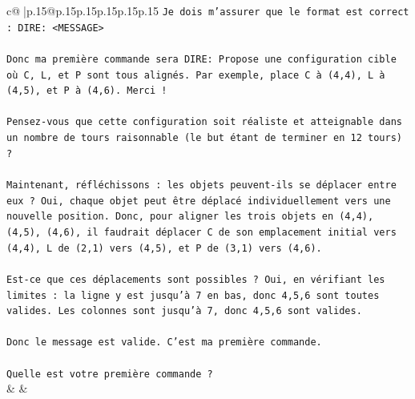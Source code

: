 \documentclass{article}
\begin{document}
{\begin{supertabular}{c@{$\;$}|p{.15\linewidth}@{}p{.15\linewidth}p{.15\linewidth}p{.15\linewidth}p{.15\linewidth}p{.15\linewidth}}
{{{\texttt{Je dois m'assurer que le format est correct : DIRE: <MESSAGE>} \\
\\ 
\texttt{Donc ma première commande sera DIRE: Propose une configuration cible où C, L, et P sont tous alignés. Par exemple, place C à (4,4), L à (4,5), et P à (4,6). Merci !} \\
\\ 
\texttt{Pensez{-}vous que cette configuration soit réaliste et atteignable dans un nombre de tours raisonnable (le but étant de terminer en 12 tours) ?} \\
\\ 
\texttt{Maintenant, réfléchissons : les objets peuvent{-}ils se déplacer entre eux ? Oui, chaque objet peut être déplacé individuellement vers une nouvelle position. Donc, pour aligner les trois objets en (4,4), (4,5), (4,6), il faudrait déplacer C de son emplacement initial vers (4,4), L de (2,1) vers (4,5), et P de (3,1) vers (4,6).} \\
\\ 
\texttt{Est{-}ce que ces déplacements sont possibles ? Oui, en vérifiant les limites : la ligne y est jusqu'à 7 en bas, donc 4,5,6 sont toutes valides. Les colonnes sont jusqu'à 7, donc 4,5,6 sont valides.} \\
\\ 
\texttt{Donc le message est valide. C'est ma première commande.} \\
\\ 
\texttt{Quelle est votre première commande ?} \\
            }
        }
    }
    & & \\ \\


\end{supertabular}}
\end{document}
